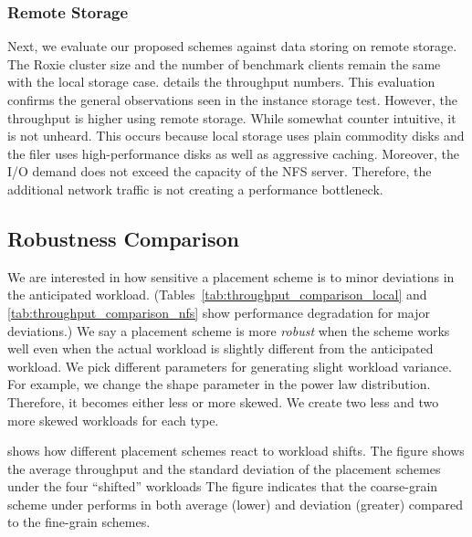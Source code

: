 \subsubsection{Remote Storage}
Next, we evaluate our proposed schemes against data storing on remote storage.
The Roxie cluster size and the number of benchmark clients remain the same
with the local storage case.
\mytable{\ref{tab:throughput_comparison_nfs}} details the throughput numbers.
This evaluation confirms the general observations seen in the instance
storage test.
However, the throughput is higher using remote storage.
While somewhat counter intuitive, it is not unheard.
This occurs because local storage uses plain commodity disks and the
filer uses high-performance disks as well as aggressive caching.
Moreover, the I/O demand does not exceed the capacity of the NFS server.
Therefore, the additional network traffic is not creating a
performance bottleneck.


\subsection{Robustness Comparison}
\label{sec:robustness}

We are interested in how sensitive a placement scheme is to minor
deviations in the anticipated workload.
(Tables~\ref{tab:throughput_comparison_local} and
\ref{tab:throughput_comparison_nfs} show performance degradation for
major deviations.)
We say a placement scheme is more \emph{robust} when the scheme works
well even when the actual workload is slightly different from the
anticipated workload.
We pick different parameters for generating slight workload variance.
For example, we change the shape parameter in the power law distribution.
Therefore, it becomes either less or more skewed.
We create two less and two more skewed workloads for each type.

\myfigure{\ref{fig:robustness}} shows how different placement schemes react
to workload shifts.
The figure shows the average throughput and the standard deviation
 of the placement schemes under the four ``shifted'' workloads
The figure indicates that the coarse-grain scheme
under performs in both average (lower) and deviation (greater)
compared to the fine-grain schemes.

